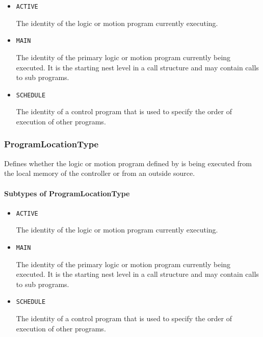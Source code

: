 \begin{itemize}

\item \texttt{ACTIVE}


The identity of the logic or motion program currently executing.

\item \texttt{MAIN}


The identity of the primary logic or motion program currently being executed. It is the starting nest level in a call structure and may contain calls to sub programs.

\item \texttt{SCHEDULE}


The identity of a control program that is used to specify the order of execution of other programs.


\end{itemize}






\subsubsection{ProgramLocationType}
\label{sec:ProgramLocationType}



Defines whether the logic or motion program defined by  is being executed from the local memory of the controller or from an outside source.



\paragraph{Subtypes of ProgramLocationType}\mbox{}
\label{sec:Subtypes of ProgramLocationType}

\begin{itemize}

\item \texttt{ACTIVE}


The identity of the logic or motion program currently executing.

\item \texttt{MAIN}


The identity of the primary logic or motion program currently being executed. It is the starting nest level in a call structure and may contain calls to sub programs.

\item \texttt{SCHEDULE}


The identity of a control program that is used to specify the order of execution of other programs.


\end{itemize}






